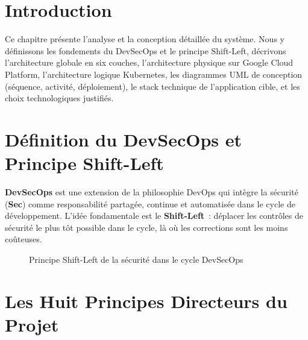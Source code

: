 ﻿%

\section*{Introduction}

Ce chapitre présente l'analyse et la conception détaillée du système. Nous y définissons
les fondements du DevSecOps et le principe Shift-Left, décrivons l'architecture globale en
six couches, l'architecture physique sur Google Cloud Platform, l'architecture logique
Kubernetes, les diagrammes UML de conception (séquence, activité, déploiement), le stack
technique de l'application cible, et les choix technologiques justifiés.


\section{Définition du DevSecOps et Principe Shift-Left}

\textbf{DevSecOps} est une extension de la philosophie DevOps qui intègre la sécurité
(\textbf{Sec}) comme responsabilité partagée, continue et automatisée dans le cycle de
développement. L'idée fondamentale est le \textbf{Shift-Left}~: déplacer les contrôles
de sécurité le plus tôt possible dans le cycle, là où les corrections sont les moins coûteuses.

\begin{figure}[H]
    \centering
    \caption{Principe Shift-Left de la sécurité dans le cycle DevSecOps}
    \label{fig:shiftleft}
\end{figure}


\section{Les Huit Principes Directeurs du Projet}

